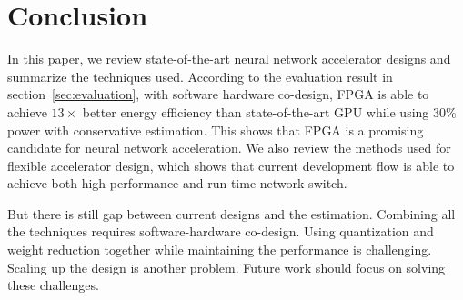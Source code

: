 \section{Conclusion}\label{sec:conclusion}

In this paper, we review state-of-the-art neural network accelerator designs and summarize the techniques used. According to the evaluation result in section~\ref{sec:evaluation}, with software hardware co-design, FPGA is able to achieve $13\times$ better energy efficiency than state-of-the-art GPU while using $30\%$ power with conservative estimation. This shows that FPGA is a promising candidate for neural network acceleration. We also review the methods used for flexible accelerator design, which shows that current development flow is able to achieve both high performance and run-time network switch.

But there is still gap between current designs and the estimation. Combining all the techniques requires software-hardware co-design. Using quantization and weight reduction together while maintaining the performance is challenging. Scaling up the design is another problem. Future work should focus on solving these challenges.